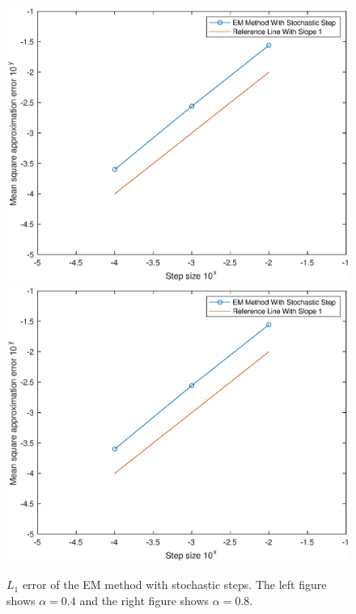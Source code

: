 \documentclass[10pt,reqno,final]{amsart}
\theoremstyle{plain}
\theoremstyle{definition}
\theoremstyle{remark}
\numberwithin{equation}{section}
\numberwithin{figure}{section}
\numberwithin{table}{section}
\begin{document}
\begin{figure}[htp!]
	\centering
	\includegraphics[width=0.45\linewidth]{stochastic_EM_0.4.eps}
	\hfill
	\includegraphics[width=0.45\linewidth]{stochastic_EM_0.8.eps}
	\caption{$L_1$ error of the EM method with stochastic steps. The left figure shows $\alpha = 0.4$ and the right figure shows $\alpha = 0.8$.}
	\label{fig:stochastic_EM}
	\vspace{-2ex}
\end{figure}
\end{document}
